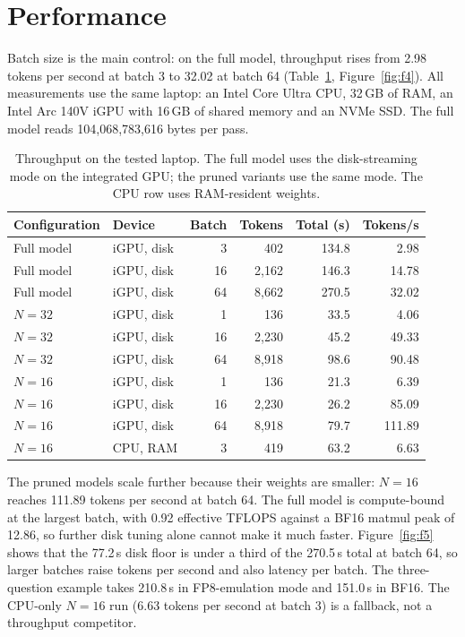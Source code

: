\documentclass[11pt,a4paper]{article}
\begin{document}
\section{Performance}
\label{sec:perf}

Batch size is the main control: on the full model, throughput rises from 2.98 tokens per second at batch 3 to 32.02 at batch 64 (Table~\ref{tab:perf}, Figure~\ref{fig:f4}). All measurements use the same laptop: an Intel Core Ultra CPU, 32\,GB of RAM, an Intel Arc 140V iGPU with 16\,GB of shared memory and an NVMe SSD. The full model reads 104,068,783,616 bytes per pass.

\begin{table}[!htbp]
\centering
\small
\caption{Throughput on the tested laptop. The full model uses the disk-streaming mode on the integrated GPU; the pruned variants use the same mode. The CPU row uses RAM-resident weights.}
\label{tab:perf}
\begin{tabular}{llrrrr}
\toprule
Configuration & Device & Batch & Tokens & Total (s) & Tokens/s \\
\midrule
Full model & iGPU, disk & 3 & 402 & 134.8 & 2.98 \\
Full model & iGPU, disk & 16 & 2,162 & 146.3 & 14.78 \\
Full model & iGPU, disk & 64 & 8,662 & 270.5 & 32.02 \\
$N=32$ & iGPU, disk & 1 & 136 & 33.5 & 4.06 \\
$N=32$ & iGPU, disk & 16 & 2,230 & 45.2 & 49.33 \\
$N=32$ & iGPU, disk & 64 & 8,918 & 98.6 & 90.48 \\
$N=16$ & iGPU, disk & 1 & 136 & 21.3 & 6.39 \\
$N=16$ & iGPU, disk & 16 & 2,230 & 26.2 & 85.09 \\
$N=16$ & iGPU, disk & 64 & 8,918 & 79.7 & 111.89 \\
$N=16$ & CPU, RAM & 3 & 419 & 63.2 & 6.63 \\
\bottomrule
\end{tabular}
\end{table}

The pruned models scale further because their weights are smaller: $N=16$ reaches 111.89 tokens per second at batch 64. The full model is compute-bound at the largest batch, with 0.92 effective TFLOPS against a BF16 matmul peak of 12.86, so further disk tuning alone cannot make it much faster. Figure~\ref{fig:f5} shows that the 77.2\,s disk floor is under a third of the 270.5\,s total at batch 64, so larger batches raise tokens per second and also latency per batch. The three-question example takes 210.8\,s in FP8-emulation mode and 151.0\,s in BF16. The CPU-only $N=16$ run (6.63 tokens per second at batch 3) is a fallback, not a throughput competitor.
\end{document}

